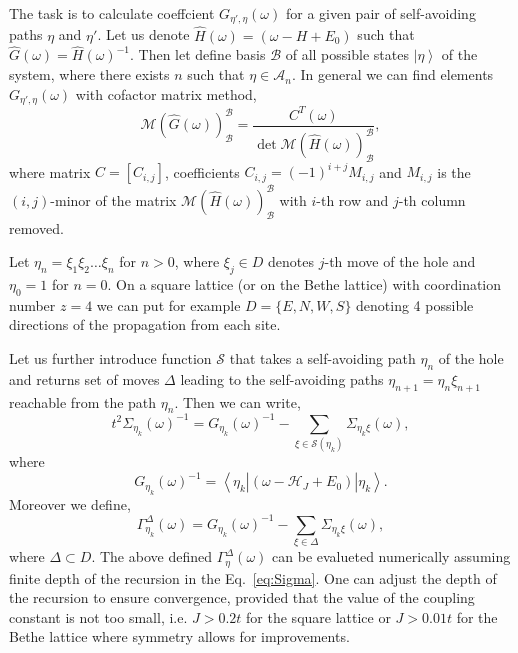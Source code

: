 \documentclass[11pt, a4paper, twocolumn]{article}
\newcommand{\ket}[1]{\left\vert #1 \right\rangle}
\newcommand{\bra}[1]{\left\langle #1 \right\vert}
\begin{document}
The task is to calculate coeffcient $G_{\eta', \eta}(\omega)$ for a given pair of self-avoiding paths $\eta$ and $\eta'$.
Let us denote $\hat{H}(\omega) = (\omega - H + E_0)$ such that $\hat{G}(\omega) = \hat{H}(\omega)^{-1}$. Then let define basis $\mathcal{B}$ of all possible states $\ket{\eta}$ of the system, where there exists $n$ such that $\eta \in \mathcal{A}_n$. In general we can find elements $G_{\eta', \eta}(\omega)$ with cofactor matrix method,
\begin{equation}
    \mathcal{M}(\hat{G}(\omega))_\mathcal{B}^\mathcal{B} = 
    \frac{C^{T}(\omega)}{\det \mathcal{M}(\hat{H}(\omega))_\mathcal{B}^\mathcal{B}},
\end{equation}
where matrix $C = [C_{i,j}]$, coefficients $C_{i,j} = (-1)^{i+j}M_{i,j}$ and $M_{i,j}$ is the $(i,j)$-minor of the matrix $\mathcal{M}(\hat{H}(\omega))_\mathcal{B}^\mathcal{B}$ with $i$-th row and $j$-th column removed. 

Let $\eta_n = \xi_1 \xi_2 \hdots \xi_n$ for $n>0$, where $\xi_j \in D$ denotes $j$-th move of the hole and $\eta_0 = 1$ for $n=0$. On a square lattice (or on the Bethe lattice) with coordination number $z=4$ we can put for example $D = \{E,N,W,S\}$ denoting 4 possible directions of the propagation from each site.

Let us further introduce function $\mathcal{S}$ that takes a self-avoiding path $\eta_n$ of the hole and returns set of moves $\Delta$ leading to the self-avoiding paths $\eta_{n+1} = \eta_n \xi_{n+1}$ reachable from the path $\eta_n$. Then we can write,
\begin{equation}\label{eq:Sigma}
    t^2\Sigma_{\eta_k}(\omega)^{-1} = G_{\eta_k}(\omega)^{-1} - \sum_{\xi \in \mathcal{S}(\eta_k)}\Sigma_{\eta_k \xi}(\omega),
\end{equation}
where
\begin{equation}
    G_{\eta_k}(\omega)^{-1} = 
    \bra{\eta_k}
    \left(
        \omega - \mathcal{H}_J + E_{0}
    \right)
    \ket{\eta_k}.
\end{equation}
Moreover we define,
\begin{equation}\label{eq:Gamma}
    \Gamma_{\eta_k}^{\Delta}(\omega) = G_{\eta_k}(\omega)^{-1} - \sum_{\xi \in \Delta}\Sigma_{\eta_k \xi}(\omega),
\end{equation}
where $\Delta \subset D$. The above defined $\Gamma_\eta^{\Delta}(\omega)$ can be evalueted numerically assuming finite depth of the recursion in the Eq.~\eqref{eq:Sigma}. One can adjust the depth of the recursion to ensure convergence, provided that the value of the coupling constant is not too small, i.e. $J > 0.2t$ for the square lattice or $J > 0.01t$ for the Bethe lattice where symmetry allows for improvements.
\end{document}
